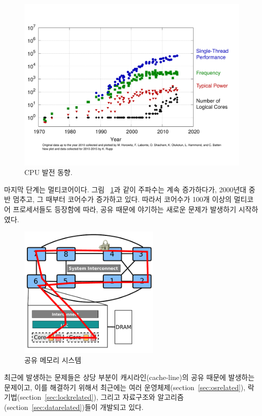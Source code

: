 \begin{figure}[h]
  \begin{center}
    \includegraphics[scale=0.3]{fig/cpu}
  \end{center}
  \caption{CPU 발전 동향.}
  \label{fig:aim7}
\end{figure}

마지막 단계는 멀티코어이다.
그림 ~\ref{fig:aim7}과 같이 주파수는 계속 증가하다가, 2000년대 중반 멈추고, 그
때부터 코어수가 증가하고 있다. 
따라서 코어수가 100개 이상의 멀티코어 프로세서들도 등장함에 따라, 공유 때문에 야기하는 
새로운 문제가 발생하기 시작하였다.


\begin{figure}[h]
    \centering
    \includegraphics[width=0.6\textwidth]{fig/archcache}
    \caption{공유 메모리 시스템}
  \label{shared_memory}
\end{figure}

 
최근에 발생하는 문제들은 상당 부분이 캐시라인(cache-line)의 공유 때문에 발생하는 문제이고, 
이를 해결하기 위해서 최근에는 여러 운영체제(section~\ref{sec:osrelated}),
 락 기법(section~\ref{sec:lockrelated}), 그리고 자료구조와
 알고리즘(section~\ref{sec:datarelated})들이 개발되고 있다.

